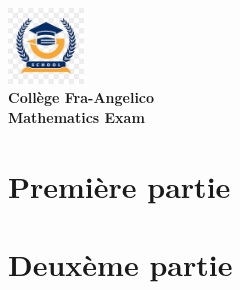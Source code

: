 \documentclass[14pt, a4paper]{article}
\begin{document}
\pagestyle{myheadings}


\begin{center}
\includegraphics[width=0.15\textwidth]{images/logo.png} \\
\textbf{Collège Fra-Angelico} \\
\textbf{Mathematics Exam}
\end{center}

% 

\section{Première partie}




\section{Deuxème partie}

\end{document}
